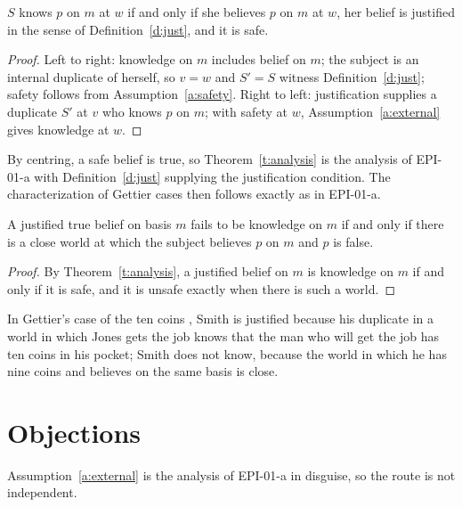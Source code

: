 \documentclass{situationist-preprint}
\begin{document}
\begin{theorem}\label{t:analysis}
$S$ knows $p$ on $m$ at $w$ if and only if she believes $p$ on $m$ at $w$, her belief is justified in the sense of Definition~\ref{d:just}, and it is safe.
\end{theorem}

\begin{proof}
Left to right: knowledge on $m$ includes belief on $m$; the subject is an internal duplicate of herself, so $v = w$ and $S' = S$ witness Definition~\ref{d:just}; safety follows from Assumption~\ref{a:safety}. Right to left: justification supplies a duplicate $S'$ at $v$ who knows $p$ on $m$; with safety at $w$, Assumption~\ref{a:external} gives knowledge at $w$.
\end{proof}

By centring, a safe belief is true, so Theorem~\ref{t:analysis} is the analysis of EPI-01-a with Definition~\ref{d:just} supplying the justification condition. The characterization of Gettier cases then follows exactly as in EPI-01-a.

\begin{corollary}\label{c:gettier}
A justified true belief on basis $m$ fails to be knowledge on $m$ if and only if there is a close world at which the subject believes $p$ on $m$ and $p$ is false.
\end{corollary}

\begin{proof}
By Theorem~\ref{t:analysis}, a justified belief on $m$ is knowledge on $m$ if and only if it is safe, and it is unsafe exactly when there is such a world.
\end{proof}

In Gettier's case of the ten coins \citep{Gettier1963}, Smith is justified because his duplicate in a world in which Jones gets the job knows that the man who will get the job has ten coins in his pocket; Smith does not know, because the world in which he has nine coins and believes on the same basis is close.

\section{Objections}

\begin{objection}
Assumption~\ref{a:external} is the analysis of EPI-01-a in disguise, so the route is not independent.
\end{objection}
\end{document}
